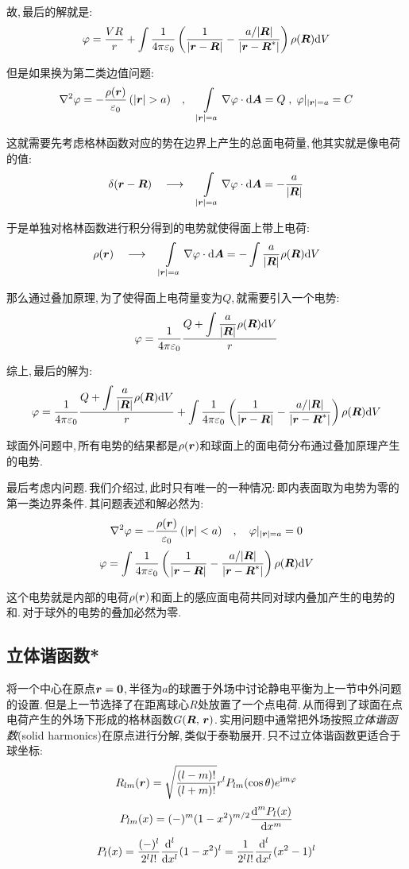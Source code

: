 故,\,最后的解就是:
\[\varphi=\frac{VR}{r}+\int \frac{1}{4\pi\varepsilon_0} \left(\frac{1}{|\boldsymbol{r}-\boldsymbol{R}|}-\frac{a/|\boldsymbol{R}|}{|\boldsymbol{r}-\boldsymbol{R}^\ast|}\right)\rho(\boldsymbol{R})\textrm{d} V\]

但是如果换为第二类边值问题:
\[\nabla^2\varphi = -\frac{\rho(\bs{r})}{\varepsilon_0}\,(|\bs{r}|>a)\quad ,\quad \int\limits_{|\bs{r}|=a}\nabla\varphi\cdot \ud \bs{A}=Q\;,\;\varphi|_{|\bs{r}|=a}=C\]

这就需要先考虑格林函数对应的势在边界上产生的总面电荷量,\,他其实就是像电荷的值:
\[\delta(\boldsymbol{r}-\boldsymbol{R})\quad \longrightarrow\quad  \int\limits_{|\boldsymbol{r}|=a}\nabla\varphi\cdot \textrm{d} \boldsymbol{A}=-\frac{a}{|\boldsymbol{R}|}\]

于是单独对格林函数进行积分得到的电势就使得面上带上电荷:
\[\rho(\boldsymbol{r})\quad \longrightarrow\quad \int\limits_{|\boldsymbol{r}|=a}\nabla\varphi\cdot \textrm{d} \boldsymbol{A}=-\int \frac{a}{|\boldsymbol{R}|}\rho(\boldsymbol{R})\textrm{d} V\]

那么通过叠加原理,\,为了使得面上电荷量变为$Q$,\,就需要引入一个电势:
\[\varphi=\frac{1}{4\pi\varepsilon_0} \frac{Q+\displaystyle\int \frac{a}{|\boldsymbol{R}|}\rho(\boldsymbol{R})\textrm{d} V}{r}\]

综上,\,最后的解为:
\[\varphi =\frac{1}{4\pi\varepsilon_0} \frac{Q+\displaystyle\int \frac{a}{|\boldsymbol{R}|}\rho(\boldsymbol{R})\textrm{d} V}{r}+\int \frac{1}{4\pi\varepsilon_0} \left(\frac{1}{|\boldsymbol{r}-\boldsymbol{R}|}-\frac{a/|\boldsymbol{R}|}{|\boldsymbol{r}-\boldsymbol{R}^\ast|}\right)\rho(\boldsymbol{R})\textrm{d} V \]

球面外问题中,\,所有电势的结果都是$\rho(\boldsymbol{r})$和球面上的面电荷分布通过叠加原理产生的电势.

最后考虑内问题.\,我们介绍过,\,此时只有唯一的一种情况:\,即内表面取为电势为零的第一类边界条件.\,其问题表述和解必然为:
\[\nabla^2\varphi = -\frac{\rho(\boldsymbol{r})}{\varepsilon_0}\,(|\boldsymbol{r}|<a)\quad ,\quad \varphi|_{|\boldsymbol{r}|=a}=0\]
\[\varphi=\int \frac{1}{4\pi\varepsilon_0} \left(\frac{1}{|\boldsymbol{r}-\boldsymbol{R}|}-\frac{a/|\boldsymbol{R}|}{|\boldsymbol{r}-\boldsymbol{R}^\ast|}\right)\rho(\boldsymbol{R})\textrm{d} V\]

这个电势就是内部的电荷$\rho(\boldsymbol{r})$和面上的感应面电荷共同对球内叠加产生的电势的和.\,对于球外的电势的叠加必然为零.

\subsection{立体谐函数*}


将一个中心在原点$\boldsymbol{r}=\boldsymbol{0}$,\,半径为$a$的球置于外场中讨论静电平衡为上一节中外问题的设置.\,但是上一节选择了在距离球心$R$处放置了一个点电荷.\,从而得到了球面在点电荷产生的外场下形成的格林函数$G(\boldsymbol{R},\,\boldsymbol{r})$.\,实用问题中通常把外场按照\emph{立体谐函数}(solid harmonics)在原点进行分解,\,类似于泰勒展开.\,只不过立体谐函数更适合于球坐标:
\[R_{lm}(\boldsymbol{r})=\sqrt{\frac{(l-m)!}{(l+m)!}}r^lP_{lm}(\cos\theta)e^{{\rm i} m\varphi}\]
\[P_{lm}(x)=(-)^m(1-x^2)^{m/2}\frac{\textrm{d}^mP_l(x)}{\textrm{d} x^m}\]
\[P_l(x)=\frac{(-)^l}{2^ll!}\frac{\textrm{d}^l}{\textrm{d} x^l}(1-x^2)^l=\frac{1}{2^ll!}\frac{\textrm{d}^l}{\textrm{d} x^l}(x^2-1)^l\]


